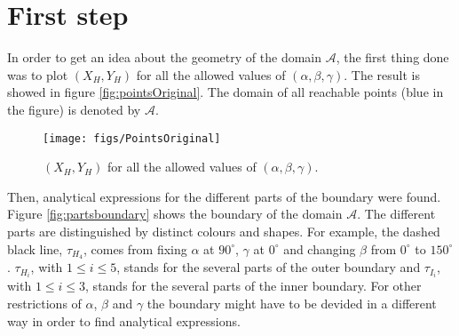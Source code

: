 %



\section{First step}

In order to get an idea about the geometry of the domain $\mathcal{A}$, the first thing done was to plot $(X_H, Y_H)$ for all the allowed values of $(\alpha, \beta, \gamma)$. The result is showed in figure \ref{fig:pointsOriginal}. The domain of all reachable points (blue in the figure) is denoted by $\mathcal{A}$.

\begin{figure}[!ht]
  \centering
  \texttt{[image: figs/PointsOriginal]}
\caption{$(X_H, Y_H)$ for all the allowed values of $(\alpha, \beta, \gamma)$. \label{fig:pointsOriginal}}
\label{fig:boundary}
\end{figure}

Then, analytical expressions for the different parts of the boundary were found.  Figure \ref{fig:partsboundary} shows the boundary of the domain $\mathcal{A}$. The different parts are distinguished by distinct colours and shapes. For example, the dashed black line, $\tau_{H_4}$, comes from fixing $\alpha$ at $90^{\circ}$, $\gamma$ at $0^{\circ}$ and changing $\beta$ from $0^{\circ}$ to $150^{\circ}$. $\tau_{H_i}$, with $1 \leq i \leq 5$, stands for the several parts of the outer boundary and $\tau_{I_i}$, with $1 \leq i \leq 3$, stands for the several parts of the inner boundary. For other restrictions of $\alpha$, $\beta$ and $\gamma$ the boundary might have to be devided in a different way in order to find analytical expressions. %

